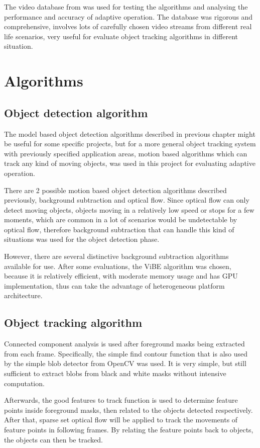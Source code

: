 The video database from \cite{goyette2012changedetection} was used for testing the algorithms and analysing the performance and accuracy of adaptive operation. The database was rigorous and comprehensive, involves lots of carefully chosen video streams from different real life scenarios, very useful for evaluate object tracking algorithms in different situation.

\section{Algorithms}

\subsection{Object detection algorithm}

The model based object detection algorithms described in previous chapter might be useful for some specific projects, but for a more general object tracking system with previously specified application areas, motion based algorithms which can track any kind of moving objects, was used in this project for evaluating adaptive operation.

There are 2 possible motion based object detection algorithms described previously, background subtraction and optical flow. Since optical flow can only detect moving objects, objects moving in a relatively low speed or stops for a few moments, which are common in a lot of scenarios would be undetectable by optical flow, therefore background subtraction that can handle this kind of situations was used for the object detection phase.

However, there are several distinctive background subtraction algorithms available for use. After some evaluations, the ViBE algorithm was chosen, because it is relatively efficient, with moderate memory usage and has GPU implementation, thus can take the advantage of heterogeneous platform architecture.

\subsection{Object tracking algorithm}

Connected component analysis is used after foreground masks being extracted from each frame. Specifically, the simple find contour function that is also used by the simple blob detector from OpenCV was used. It is very simple, but still sufficient to extract blobs from black and white masks without intensive computation.

Afterwards, the good features to track function is used to determine feature points inside foreground masks, then related to the objects detected respectively. After that, sparse set optical flow will be applied to track the movements of feature points in following frames. By relating the feature points back to objects, the objects can then be tracked.

